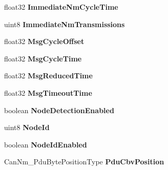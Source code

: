 \begin{DoxyCompactItemize}
\item 
float32 {\bfseries Immediate\+Nm\+Cycle\+Time}\hypertarget{structCanNm__ChannelType_ab92e664437a5578e46403402e270e1d4}{}\label{structCanNm__ChannelType_ab92e664437a5578e46403402e270e1d4}

\item 
uint8 {\bfseries Immediate\+Nm\+Transmissions}\hypertarget{structCanNm__ChannelType_af690e1dbbc55cc22f9b276d47f7c32ea}{}\label{structCanNm__ChannelType_af690e1dbbc55cc22f9b276d47f7c32ea}

\item 
float32 {\bfseries Msg\+Cycle\+Offset}\hypertarget{structCanNm__ChannelType_ad1291bd68dfcb9e2be63ea156c777627}{}\label{structCanNm__ChannelType_ad1291bd68dfcb9e2be63ea156c777627}

\item 
float32 {\bfseries Msg\+Cycle\+Time}\hypertarget{structCanNm__ChannelType_ae852980ab24c2148bc3a53de0e622157}{}\label{structCanNm__ChannelType_ae852980ab24c2148bc3a53de0e622157}

\item 
float32 {\bfseries Msg\+Reduced\+Time}\hypertarget{structCanNm__ChannelType_a82ea38356f471635483fa0f8a6cee49a}{}\label{structCanNm__ChannelType_a82ea38356f471635483fa0f8a6cee49a}

\item 
float32 {\bfseries Msg\+Timeout\+Time}\hypertarget{structCanNm__ChannelType_a9a9f99406088a468f83fb060f80714f0}{}\label{structCanNm__ChannelType_a9a9f99406088a468f83fb060f80714f0}

\item 
boolean {\bfseries Node\+Detection\+Enabled}\hypertarget{structCanNm__ChannelType_ac7f1d50efbed834baa413b206c28869b}{}\label{structCanNm__ChannelType_ac7f1d50efbed834baa413b206c28869b}

\item 
uint8 {\bfseries Node\+Id}\hypertarget{structCanNm__ChannelType_a52d603068f0c8a5264a9c32c8987b652}{}\label{structCanNm__ChannelType_a52d603068f0c8a5264a9c32c8987b652}

\item 
boolean {\bfseries Node\+Id\+Enabled}\hypertarget{structCanNm__ChannelType_af22b4e79f21379e0eb7ce92fb574a016}{}\label{structCanNm__ChannelType_af22b4e79f21379e0eb7ce92fb574a016}

\item 
Can\+Nm\+\_\+\+Pdu\+Byte\+Position\+Type {\bfseries Pdu\+Cbv\+Position}\hypertarget{structCanNm__ChannelType_a570e540338b09d62636e3dd619b125d2}{}\label{structCanNm__ChannelType_a570e540338b09d62636e3dd619b125d2}


\end{DoxyCompactItemize}
